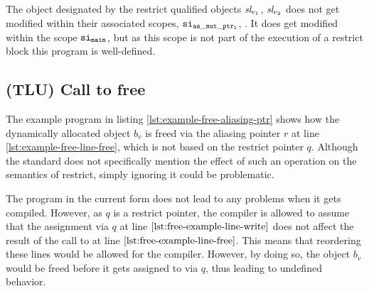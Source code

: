 The object designated by the restrict qualified objects $\textit{sl}_{v_1}$, $\textit{sl}_{v_2}$ does not get modified
within their associated scopes, $\mathtt{si}_\mathtt{as\_mut\_ptr_1}$, . It does get modified within the scope
$\mathtt{si}_\mathtt{main}$, but as this scope is not part of the execution of a restrict block this program is well-defined.

\subsection{(TLU) Call to free}\label{subsec:call-to-free} %
The example program in listing \ref{lst:example-free-aliasing-ptr} shows how the dynamically allocated object $b_v$ is freed via the
aliasing pointer $r$ at line \ref{lst:example-free-line-free}, which is not based on the restrict pointer $q$. Although the standard does not
specifically mention the effect of such an operation on the semantics of restrict, simply ignoring it could be problematic.

The program in the current form does not lead to any problems when it gets compiled. However, as $q$
is a restrict pointer, the compiler is allowed to assume that the assignment via $q$ at line
$\ref{lst:free-example-line-write}$ does not affect the result of the call to  at line $\ref{lst:free-example-line-free}$.
This means that reordering these lines would be allowed for the compiler. However, by doing so, the object
$b_v$ would be freed before it gets assigned to via $q$, thus leading to undefined behavior.

